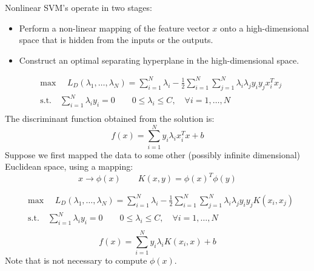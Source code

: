 Nonlinear SVM's operate in two stages:
\begin{itemize}
	\item Perform a non-linear mapping of the feature vector $x$ onto a high-dimensional space that is hidden from the inputs or the outputs.
	\item Construct an optimal separating hyperplane in the high-dimensional space.
\end{itemize}

\begin{equation*}
\begin{aligned}
&\text{max }\quad L_D(\lambda_1,\dots,\lambda_N) = \sum_{i = 1}^{N}\lambda_i - \frac{1}{2}\sum_{i = 1}^{N}\sum_{j = 1}^{N}\lambda_i\lambda_jy_iy_jx_i^Tx_j\\
&\text{s.t.} \quad \sum_{i = 1}^{N}\lambda_iy_i= 0 \qquad 0 \leq \lambda_i \leq C, \quad \forall i = 1,\dots,N\\
\end{aligned}
\end{equation*}
The discriminant function obtained from the solution is:
$$f(x) = \sum\limits_{i = 1}^Ny_i\lambda_ix_i^Tx +b$$
Suppose we first mapped the data to some other (possibly infinite dimensional) Euclidean space, using a mapping:
$$x \rightarrow \phi(x) \qquad K(x,y) = \phi(x)^T\phi(y)$$

\begin{equation*}
\begin{aligned}
&\text{max }\quad L_D(\lambda_1,\dots,\lambda_N) = \sum_{i = 1}^{N}\lambda_i - \frac{1}{2}\sum_{i = 1}^{N}\sum_{j = 1}^{N}\lambda_i\lambda_jy_iy_jK(x_i,x_j)\\
&\text{s.t.} \quad \sum_{i = 1}^{N}\lambda_iy_i= 0 \qquad 0 \leq \lambda_i \leq C, \quad \forall i = 1,\dots,N\\
\end{aligned}
\end{equation*}
$$f(x) = \sum\limits_{i = 1}^Ny_i\lambda_iK(x_i, x) +b$$
Note that is not necessary to compute $\phi(x)$.


